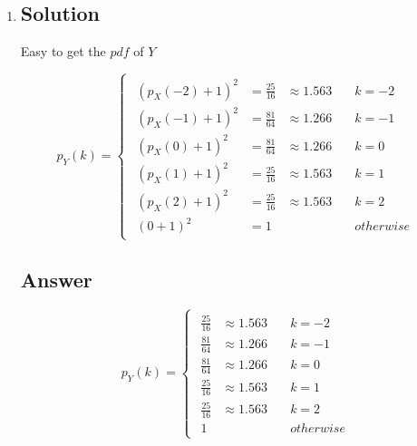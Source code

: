 \documentclass[12pt]{article}
\begin{document}
	\begin{enumerate}[label={},leftmargin=0in]\item
		\subsection*{Solution}
		
			Easy to get the $pdf$ of $Y$
			
			\[
			p_Y(k) =
			\begin{cases}
				\begin{aligned}
					(p_X(-2) + 1)^2 &= \frac{25}{16} &\approx 1.563 &\quad k = -2\\
					(p_X(-1) + 1)^2 &= \frac{81}{64} &\approx 1.266 &\quad k = -1\\
					(p_X(0) + 1)^2 &= \frac{81}{64} &\approx 1.266 &\quad k = 0\\
					(p_X(1) + 1)^2 &= \frac{25}{16} &\approx 1.563 &\quad k = 1\\
					(p_X(2) + 1)^2 &= \frac{25}{16} &\approx 1.563 &\quad k = 2\\
					(0 + 1)^2 &= 1 & &\quad otherwise
				\end{aligned}
			\end{cases}
			\]
		
		\subsection*{Answer}
		
			\[\boxed{p_Y(k) =
				\begin{cases}
					\begin{aligned}
						\frac{25}{16} &\approx 1.563 &\quad k = -2\\
						\frac{81}{64} &\approx 1.266 &\quad k = -1\\
						\frac{81}{64} &\approx 1.266 &\quad k = 0\\
						\frac{25}{16} &\approx 1.563 &\quad k = 1\\
						\frac{25}{16} &\approx 1.563 &\quad k = 2\\
						1 & &\quad otherwise
					\end{aligned}
			\end{cases}}\]
	\end{enumerate}
	
\end{document}
